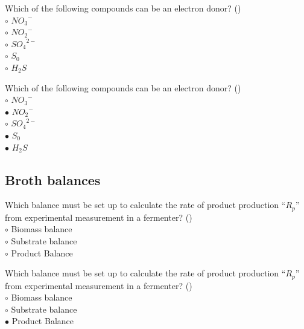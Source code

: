 \documentclass[]{beamer}
\begin{document}
\begin{frame}[shrink] {}
\addtocounter{questions}{1}
\color{blue}
Which of the following compounds can be an electron donor?   ()\\
\color{black}
\setlength{\parindent}{-0.4cm}
{\color{red}$\circ$}  ${NO_{3}}^{-}$\\
{\color{red}$\circ$} ${NO_{2}}^{-}$\\
{\color{red}$\circ$} ${SO_{4}}^{2-}$\\
{\color{red}$\circ$} $S_0$\\
{\color{red}$\circ$} $H_{2}S$ \\
\end{frame}
\begin{frame}[shrink] {}
\addtocounter{answers}{1}
\color{blue}
Which of the following compounds can be an electron donor?   ()\\
\color{black}
\setlength{\parindent}{-0.4cm}
{\color{red}$\circ$}  ${NO_{3}}^{-}$\\
{\color{red}$\bullet$} ${NO_{2}}^{-}$\\
{\color{red}$\circ$} ${SO_{4}}^{2-}$\\
{\color{red}$\bullet$} $S_0$\\
{\color{red}$\bullet$} $H_{2}S$ \\
\end{frame}

\subsection{Broth balances}
\setcounter{questions}{0}
\setcounter{answers}{0}

\begin{frame}[shrink] {}
\addtocounter{questions}{1}
\color{blue}
Which balance must be set up to calculate the rate of product production “$R_p$” from experimental measurement in a fermenter? ()\\
\color{black}
\setlength{\parindent}{-0.4cm}
{\color{red}$\circ$} Biomass balance\\
{\color{red}$\circ$} Substrate balance\\
{\color{red}$\circ$} Product Balance \\
\end{frame}
\begin{frame}[shrink] {}
\addtocounter{answers}{1}
\color{blue}
Which balance must be set up to calculate the rate of product production “$R_p$” from experimental measurement in a fermenter? ()\\
\color{black}
\setlength{\parindent}{-0.4cm}
{\color{red}$\circ$} Biomass balance\\
{\color{red}$\circ$} Substrate balance\\
{\color{red}$\bullet$} Product Balance \\
\end{frame}
\end{document}

